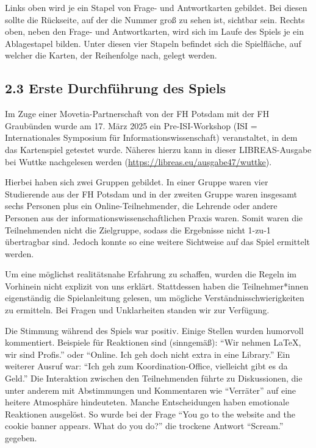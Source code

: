 \documentclass[a4paper,
fontsize=11pt,
oneside,
numbers=noperiodatend,
parskip=half-,
bibliography=totoc,
final
]{scrartcl}
\begin{document}
Links oben wird je ein Stapel von Frage- und Antwortkarten gebildet. Bei
diesen sollte die Rückseite, auf der die Nummer groß zu sehen ist,
sichtbar sein. Rechts oben, neben den Frage- und Antwortkarten, wird
sich im Laufe des Spiels je ein Ablagestapel bilden. Unter diesen vier
Stapeln befindet sich die Spielfläche, auf welcher die Karten, der
Reihenfolge nach, gelegt werden.

\subsection{2.3 Erste Durchführung des
Spiels}\label{erste-durchfuxfchrung-des-spiels}

Im Zuge einer Movetia-Partnerschaft von der FH Potsdam mit der FH
Graubünden wurde am 17. März 2025 ein Pre-ISI-Workshop (ISI =
Internationales Symposium für Informationswissenschaft) veranstaltet, in
dem das Kartenspiel getestet wurde. Näheres hierzu kann in dieser
LIBREAS-Ausgabe bei Wuttke nachgelesen werden
(\url{https://libreas.eu/ausgabe47/wuttke}).

Hierbei haben sich zwei Gruppen gebildet. In einer Gruppe waren vier
Studierende aus der FH Potsdam und in der zweiten Gruppe waren insgesamt
sechs Personen plus ein Online-Teilnehmender, die Lehrende oder andere
Personen aus der informationswissenschaftlichen Praxis waren. Somit
waren die Teilnehmenden nicht die Zielgruppe, sodass die Ergebnisse
nicht 1-zu-1 übertragbar sind. Jedoch konnte so eine weitere Sichtweise
auf das Spiel ermittelt werden.

Um eine möglichst realitätsnahe Erfahrung zu schaffen, wurden die Regeln
im Vorhinein nicht explizit von uns erklärt. Stattdessen haben die
Teilnehmer*innen eigenständig die Spielanleitung gelesen, um mögliche
Verständnisschwierigkeiten zu ermitteln. Bei Fragen und Unklarheiten
standen wir zur Verfügung.

Die Stimmung während des Spiels war positiv. Einige Stellen wurden
humorvoll kommentiert. Beispiele für Reaktionen sind (sinngemäß):
\enquote{Wir nehmen LaTeX, wir sind Profis.} oder \enquote{Online. Ich
geh doch nicht extra in eine Library.} Ein weiterer Ausruf war:
\enquote{Ich geh zum Koordination-Office, vielleicht gibt es da Geld.}
Die Interaktion zwischen den Teilnehmenden führte zu Diskussionen, die
unter anderem mit Abstimmungen und Kommentaren wie \enquote{Verräter}
auf eine heitere Atmosphäre hindeuteten. Manche Entscheidungen haben
emotionale Reaktionen ausgelöst. So wurde bei der Frage \enquote{You go
to the website and the cookie banner appears. What do you do?} die
trockene Antwort \enquote{Scream.} gegeben.
\end{document}
